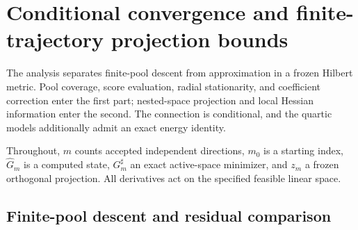 \documentclass[11pt]{article}
\def\CGAChapterFiveStandalone{1}
\theoremstyle{remark}\newtheorem{remark}[theorem]{Remark}
\begin{document}
\setcounter{section}{4}
\fi
\providecommand{\cE}{\mathcal E}
\providecommand{\cD}{\mathcal D}
\providecommand{\cP}{\mathcal P}
\providecommand{\cK}{\mathcal K}
\providecommand{\cnorm}[1]{\left\lVert#1\right\rVert}
\providecommand{\cabs}[1]{\left|#1\right|}
\providecommand{\cinner}[2]{\left\langle#1,#2\right\rangle}
\providecommand{\cR}{\mathbb R}
\providecommand{\cdd}{\,\mathrm d}
\ifdefined\CGAChapterFiveStandalone
  \newcommand{\CGAHLDreference}{Section~3}
  \newcommand{\CGAEnergyMetricReference}{the energy--distance theorem and metric corollary in Section~4}
  \newcommand{\CGAEnergyTheoremReference}{the energy--distance theorem in Section~4}
\else
  \newcommand{\CGAHLDreference}{Section~\ref{sec:c5-descent}}
  \newcommand{\CGAEnergyMetricReference}{Theorem~\ref{thm:energy-v} and Corollary~\ref{cor:metric-rates}}
  \newcommand{\CGAEnergyTheoremReference}{Theorem~\ref{thm:energy-v}}
\fi

\section{Conditional convergence and finite-trajectory projection bounds}
\label{sec:c5}

The analysis separates finite-pool descent from approximation in a frozen
Hilbert metric.  Pool coverage, score evaluation, radial stationarity, and
coefficient correction enter the first part; nested-space projection and local
Hessian information enter the second.  The connection is conditional, and the
quartic models additionally admit an exact energy identity.

Throughout, $m$ counts accepted independent directions, $m_0$ is a starting
index, $\widehat G_m$ is a computed state, $G_m^\sharp$ an exact active-space
minimizer, and $z_m$ a frozen orthogonal projection.  All derivatives act on
the specified feasible linear space.

\subsection{Finite-pool descent and residual comparison}
\label{sec:c5-descent}
\label{sec:descent}
\end{document}
